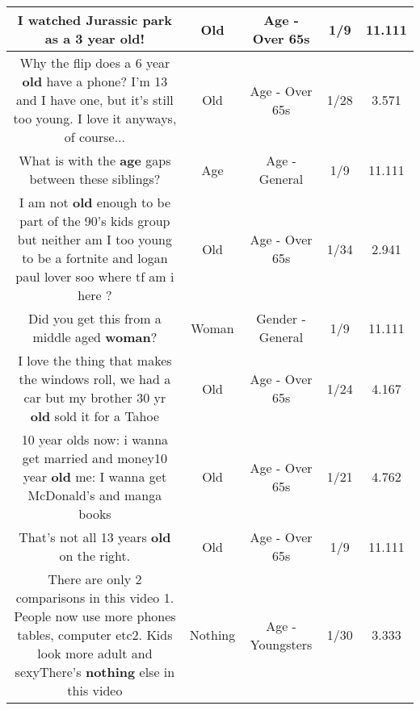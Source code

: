 \documentclass[11pt]{article}
\newlength\mylength
\begin{document}
\begin{center}
\begin{longtable}{|C{.65\mylength}|C{.30\mylength}|C{.12\mylength}|C{.12\mylength}|C{.12\mylength}|}
  \small I watched Jurassic park as a 3 year \textbf{old}!\normalsize   & Old & Age - Over 65s & 1/9 & 11.111 \\  \hline
  \small Why the flip does a 6 year \textbf{old} have a phone? I'm 13 and I have one, but it's still too young. I love it anyways, of course...\normalsize   & Old & Age - Over 65s & 1/28 & 3.571 \\  \hline
  \small What is with the \textbf{age} gaps between these siblings?\normalsize   & Age & Age - General & 1/9 & 11.111 \\  \hline
  \small I am not \textbf{old} enough to be part of the 90's kids group but neither am I too young to be a fortnite and logan paul lover soo where tf am i here ?\normalsize   & Old & Age - Over 65s & 1/34 & 2.941 \\  \hline
  \small Did you get this from a middle aged \textbf{woman}?\normalsize   & Woman & Gender - General & 1/9 & 11.111 \\  \hline
  \small I love the thing that makes the windows roll, we had a car but my brother 30 yr \textbf{old} sold it for a Tahoe\normalsize   & Old & Age - Over 65s & 1/24 & 4.167 \\  \hline
  \small 10 year olds now: i wanna get married and money10 year \textbf{old} me: I wanna get McDonald's and manga books\normalsize   & Old & Age - Over 65s & 1/21 & 4.762 \\  \hline
  \small That's not all 13 years \textbf{old} on the right.\normalsize   & Old & Age - Over 65s & 1/9 & 11.111 \\  \hline
  \small There are only 2 comparisons in this video 1. People now use more phones tables, computer etc2. Kids look more adult and sexyThere's \textbf{nothing} else in this video\normalsize   & Nothing & Age - Youngsters & 1/30 & 3.333 \\  \hline

\end{longtable}
\end{center}
\end{document}
